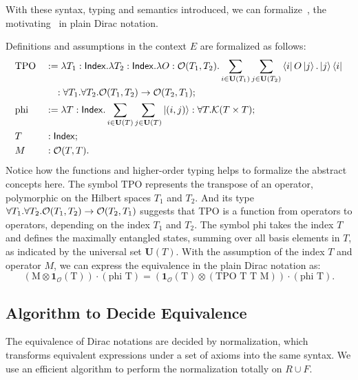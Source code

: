 With these syntax, typing and semantics introduced, we can formalize~, the motivating~ in plain Dirac notation.
\begin{example}
    \label{ex: formalizing motivating}
    Definitions and assumptions in the context \( E \) are formalized as follows:
    \begin{align*}
        & \text{TPO} && := \lambda T_1 : \mathsf{Index}. \lambda T_2 : \mathsf{Index}. \lambda O : \mathcal{O}(T_1, T_2). \sum_{i \in \mathbf{U}(T_1)} \sum_{j \in \mathbf{U}(T_2)} \bra{i} O \ket{j} . \ket{j}\bra{i} \\
        & &&\quad : \forall T_1. \forall T_2. \mathcal{O}(T_1, T_2) \to \mathcal{O}(T_2, T_1); \\
        &\text{phi} &&:= \lambda T : \mathsf{Index}. \sum_{i \in \mathbf{U}(T)} \sum_{j \in \mathbf{U}(T)} \ket{(i, j)} : \forall T.\mathcal{K}(T \times T); \\
        & T && : \mathsf{Index}; \\
        & M && : \mathcal{O}(T, T).
    \end{align*}
    Notice how the functions and higher-order typing helps to formalize the abstract concepts here.
    The symbol \( \text{TPO} \) represents the transpose of an operator, polymorphic on the Hilbert spaces \( T_1 \) and \( T_2 \). And its type \(\forall T_1. \forall T_2. \mathcal{O}(T_1, T_2) \to \mathcal{O}(T_2, T_1)\) suggests that TPO is a function from operators to operators, depending on the index $T_1$ and $T_2$.
    The symbol \( \text{phi} \) takes the index \( T \) and defines the maximally entangled states, summing over all basis elements in \( T \), as indicated by the universal set \( \mathbf{U}(T) \).
    With the assumption of the index \( T \) and operator \( M \), we can express the equivalence in the plain Dirac notation as:
    \[
    (\textrm{M} \otimes \mathbf{1}_\mathcal{O}(\textrm{T})) \cdot (\textrm{phi T}) = (\mathbf{1}_\mathcal{O}(\textrm{T}) \otimes (\textrm{TPO T T M})) \cdot (\textrm{phi T}).
    \]
\end{example}



\subsection{Algorithm to Decide Equivalence}

The equivalence of Dirac notations are decided by normalization, which transforms equivalent expressions under a set of axioms into the same syntax. We use an efficient algorithm to perform the normalization totally on $R \cup F$.


